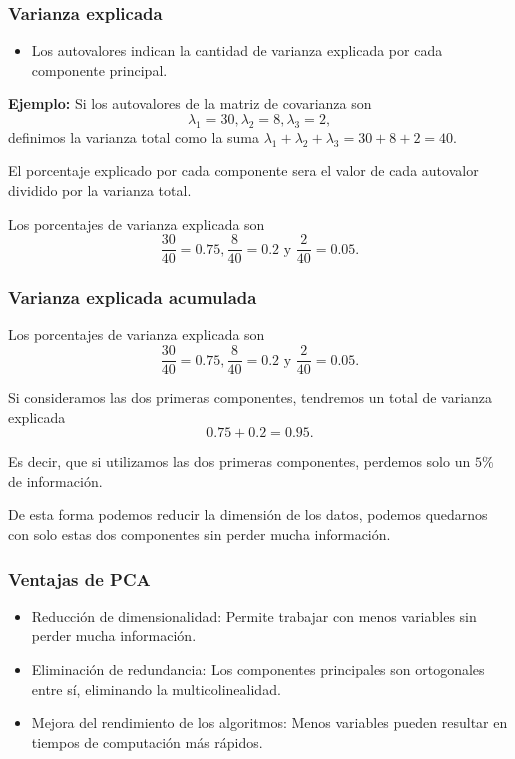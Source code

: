 \documentclass[aspectratio=169,12pt]{beamer}
\begin{document}
\begin{frame}
    \frametitle{Varianza explicada}
    \begin{itemize}
        \item Los autovalores indican la cantidad de varianza explicada por cada componente principal.
    \end{itemize}

\textbf{Ejemplo:} Si los autovalores de la matriz de covarianza son 
$$
\lambda_1 = 30, \lambda_2 = 8, \lambda_3 = 2,
$$
definimos la varianza total como la suma $\lambda_1 + \lambda_2 + \lambda_3 = 30 + 8 + 2 = 40$.

El porcentaje explicado por cada componente sera el valor de cada autovalor dividido por la varianza total.

Los porcentajes de varianza explicada son 
$$\frac{30}{40} = 0.75, \frac{8}{40} = 0.2 \text{ y } \frac{2}{40} = 0.05.$$

\end{frame}

\begin{frame}
    \frametitle{Varianza explicada acumulada}

Los porcentajes de varianza explicada son
$$\frac{30}{40} = 0.75, \frac{8}{40} = 0.2 \text{ y } \frac{2}{40} = 0.05.$$

Si consideramos las dos primeras componentes, tendremos un total de varianza explicada 
$$0.75 + 0.2 = 0.95.$$

Es decir, que si utilizamos las dos primeras componentes, perdemos solo un $5\%$ de información. 

De esta forma podemos reducir la dimensión de los datos, podemos quedarnos con solo estas dos componentes sin perder mucha información.

\end{frame}

\begin{frame}
    \frametitle{Ventajas de PCA}
    \begin{itemize}
        \item Reducción de dimensionalidad: Permite trabajar con menos variables sin perder mucha información.
        \item Eliminación de redundancia: Los componentes principales son ortogonales entre sí, eliminando la multicolinealidad.
        \item Mejora del rendimiento de los algoritmos: Menos variables pueden resultar en tiempos de computación más rápidos.
    \end{itemize}
\end{frame}
\end{document}
